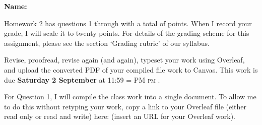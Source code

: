 \documentclass[12pt,fleqn,answers]{exam}
\makeatletter
\newcommand{\quiz}{2}
\newcommand{\term}{Fall}
\DeclareRobustCommand{\maybefakesc}[1]{%
  \ifnum\pdfstrcmp{\f@series}{\bfdefault}=\z@
    {\fontsize{\dimexpr0.8\dimexpr\f@size pt\relax}{0}\selectfont\uppercase{#1}}%
  \else
    \textsc{#1}%
  \fi
}
\newcommand\PM{\maybefakesc{pm}\xspace}
\makeatother
\begin{document}
\large
\vspace{0.1in}
\noindent{}
{\bf Name:}  \\
\noindent \makebox[3.0truein][l]{\textbf{Homework \quiz, \term \/ \the\year}}
\vspace{0.1in}

\noindent  Homework \quiz\/  has questions 1 through  \numquestions \/ with a total 
of  \numpoints\/  points. When I record your grade, I will scale it to twenty points. 
For details of the grading scheme for this assignment, please see the section 
`Grading rubric' of our syllabus.

Revise, proofread, revise again (and again), typeset your work using Overleaf, and 
upload the converted PDF of your compiled file work to Canvas.  
This work is due \textbf{Saturday 2 September} at 11:59 \PM.

\vspace{0.1in}

For Question 1, I will compile the class work into a single document. To allow me to do this without retyping your work,
copy a link to your Overleaf file (either read only or read and write) here: \url{  } 
(insert an URL for your Overleaf work).
\end{document}

